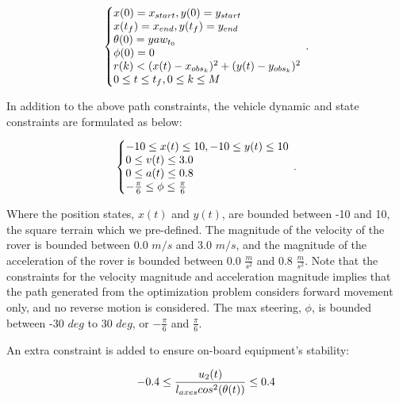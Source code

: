 \documentclass{article}
\begin{document}
\begin{equation}
	\label{equ:car_cons}
	\left\{\begin{array}{@{}l@{}}
		x(0) = x_{start}, y(0) = y_{start}  \\
		x(t_{f}) = x_{end}, y(t_{f}) = y_{end}  \\
		\theta(0) =yaw_{t_{0}}  \\
		\phi(0) = 0 \\
		r(k) < (x(t)-x_{obs_{k}})^2 + (y(t)-y_{obs_{k}})^2  \\
		0 \leq t \leq t_{f}, 0 \leq k \leq M \\
	\end{array}\right.\,.
\end{equation}

In addition to the above path constraints, the vehicle dynamic and state constraints are formulated as below:

\begin{equation}
	\label{equ:car_dyn_con}
	\left\{\begin{array}{@{}l@{}}
		-10 \leq x(t) \leq 10, -10 \leq y(t) \leq 10  \\
		 0 \leq v(t) \leq 3.0 \\
		 0 \leq a(t) \leq 0.8 \\
		 -\frac{\pi}{6} \leq \phi \leq \frac{\pi}{6} \\
	\end{array}\right.\,.
\end{equation}

Where the position states, $x(t)$ and $y(t)$, are bounded between -10 and 10, the square terrain which we pre-defined. The magnitude of the velocity of the rover is bounded between 0.0 $m/s$ and 3.0 $m/s$, and the magnitude of the acceleration of the rover is bounded between 0.0 $\frac{m}{s^2}$ and 0.8 $\frac{m}{s^2}$. Note that the constraints for the velocity magnitude and acceleration magnitude implies that the path generated from the optimization problem considers forward movement only, and no reverse motion is considered. The max steering, $\phi$, is bounded between -30 $deg$ to 30 $deg$, or $-\frac{\pi}{6}$ and $\frac{\pi}{6}$.  

An extra constraint is added to ensure on-board equipment's stability:

\begin{equation}
	\label{equ:car_stability}
	-0.4 \leq \frac{u_{2}(t)}{l_{axes}cos^{2}(\theta(t) )} \leq 0.4 \\
\end{equation}
\end{document}
